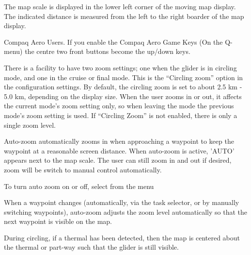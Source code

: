 The map scale is displayed in the lower left corner of the moving map
display. The indicated distance is measured from the left to the right boarder
of the map display.

Compaq Aero Users. If you enable the Compaq Aero Game Keys (On the
Q-menu) the centre two front buttons become the up/down keys.

There is a facility to have two zoom settings; one when the glider is
in circling mode, and one in the cruise or final mode.  This is the ``Circling
zoom'' option in the  configuration settings.  
By default, the circling zoom is set to about 2.5 km - 5.0 km, depending on the
display size. When the user zooms in or out, it affects the current
mode's zoom setting only, so when leaving the mode the previous mode's
zoom setting is used.  If ``Circling Zoom'' is not enabled,
there is only a single zoom level.

Auto-zoom automatically zooms in when approaching a waypoint to keep
the waypoint at a reasonable screen distance. When auto-zoom is active,
'AUTO' appears next to the map scale. The user can still zoom
in and out if desired, zoom will be switch to manual control automatically.

To turn auto zoom on or off, select from the menu
\begin{quote}
\blink{} 
\end{quote}

When a waypoint changes (automatically, via the task selector, or by
manually switching waypoints), auto-zoom adjusts the zoom level
automatically so that the next waypoint is visible on the map.

During circling, if a thermal has been detected, then the map is centered about
the thermal or part-way such that the glider is still visible.

